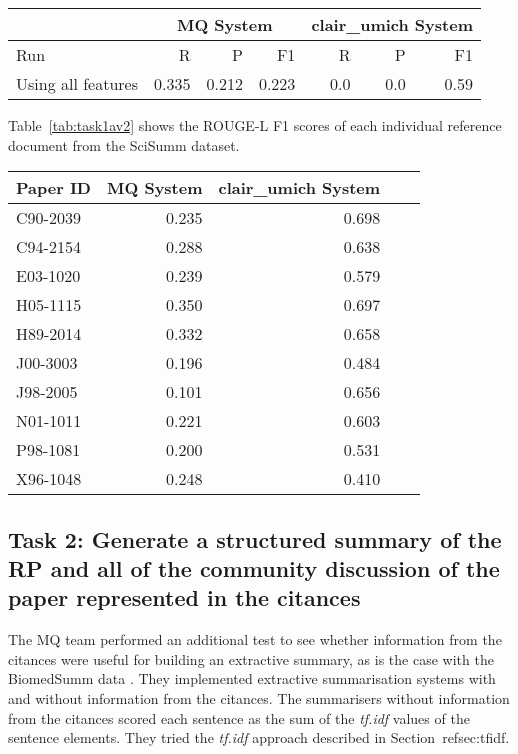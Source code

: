 \documentclass[11pt]{article}
\begin{document}
\begin{table*}
\centering
\begin{tabular}{l|rrr|rrr}
& \multicolumn{3}{|c|}{MQ System} & \multicolumn{3}{c}{clair\_umich System}\\
\hline
Run & R & P & F1 & R & P & F1\\
\hline
Using all features & 0.335 & 0.212 & 0.223 & 0.0 & 0.0 & 0.59\\
\end{tabular}
\caption{ROUGE-L results of the participating systems for task 1a}
\label{tab:task1a}
\end{table*}

Table~\ref{tab:task1av2} shows the ROUGE-L F1 scores of each individual reference document from the SciSumm dataset.

\begin{table*}
  \centering
  \begin{tabular}{l|rrrr}
Paper ID & MQ System & clair\_umich System\\
\hline
C90-2039 & 0.235 & 0.698\\ 
C94-2154 & 0.288 & 0.638\\
E03-1020 & 0.239 & 0.579\\
H05-1115 & 0.350 & 0.697\\
H89-2014 & 0.332 & 0.658\\
J00-3003 & 0.196 & 0.484\\
J98-2005 & 0.101 & 0.656\\
N01-1011 & 0.221 & 0.603\\
P98-1081 & 0.200 & 0.531\\
X96-1048 & 0.248 & 0.410\\
\hline


  \end{tabular}
  \caption{ROUGE-L F1 results for individual topics
  1a}
  \label{tab:task1av2}
\end{table*}


\subsection{Task 2: Generate a structured summary of the RP and all of the community discussion of the paper represented in the citances}


The MQ team performed an additional test to see  whether information from the citances were useful for building an extractive summary, as is the case with the BiomedSumm data \cite{Molla:ALTA2014}. They implemented extractive summarisation systems with and without information from the citances. 
The summarisers without information from the citances scored each sentence as the sum of the \emph{tf.idf} values of the sentence
elements. They tried the \emph{tf.idf} approach described in Section~ref{sec:tfidf}.
\end{document}
